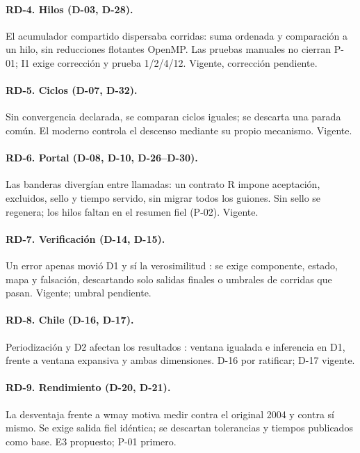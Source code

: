 \paragraph{RD-4. Hilos (D-03, D-28).} El acumulador compartido dispersaba corridas:
suma ordenada y comparación a un hilo, sin reducciones flotantes OpenMP. Las pruebas
manuales no cierran P-01; I1 exige corrección y prueba 1/2/4/12. Vigente, corrección pendiente.

\paragraph{RD-5. Ciclos (D-07, D-32).} Sin convergencia declarada, se comparan ciclos
iguales; se descarta una parada común. El moderno controla el descenso mediante su propio
mecanismo. Vigente.

\paragraph{RD-6. Portal (D-08, D-10, D-26--D-30).} Las banderas divergían entre llamadas:
un contrato R impone aceptación, excluidos, sello y tiempo servido, sin migrar todos los
guiones. Sin sello se regenera; los hilos faltan en el resumen fiel (P-02). Vigente.

\paragraph{RD-7. Verificación (D-14, D-15).} Un error apenas movió D1 y sí la
verosimilitud \parencite{nieves2026jcc}: se exige componente, estado, mapa y falsación,
descartando solo salidas finales o umbrales de corridas que pasan. Vigente; umbral pendiente.

\paragraph{RD-8. Chile (D-16, D-17).} Periodización y D2 afectan los resultados
\parencite{nieves2026jcc}: ventana igualada e inferencia en D1, frente a ventana expansiva
y ambas dimensiones. D-16 por ratificar; D-17 vigente.

\paragraph{RD-9. Rendimiento (D-20, D-21).} La desventaja frente a wmay
\parencite{nieves2026jcc} motiva medir contra el original 2004 y contra sí mismo. Se exige
salida fiel idéntica; se descartan tolerancias y tiempos publicados como base. E3 propuesto;
P-01 primero.
\endgroup

